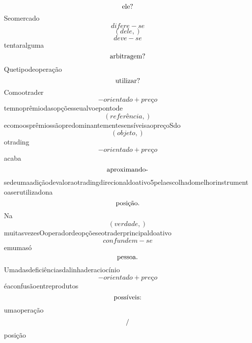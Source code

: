 \documentclass{article}
\begin{document}
\begin{equation}
$ele?$
\end{equation}Seomercado\begin{equation}
difere - se
\end{equation}\begin{equation}
\left( dele,\right)
\end{equation}\begin{equation}
deve - se
\end{equation}tentaralguma\begin{equation}
$arbitragem?$
\end{equation}Quetipodeoperação\begin{equation}
$utilizar?$
\end{equation}Comootrader\begin{equation}
- orientado + preço
\end{equation}temnoprêmiodasopçõesseualvoepontode\begin{equation}
\left( referência,\right)
\end{equation}ecomoosprêmiossãopredominantementesensíveisaopreçoSdo\begin{equation}
\left( objeto,\right)
\end{equation}otrading\begin{equation}
- orientado + preço
\end{equation}acaba\begin{equation}
$aproximando-$
\end{equation}sedeumaadiçãodevaloraotradingdirecionaldoativo5pelaescolhadomelhorinstrumentoaserutilizadona\begin{equation}
$posição.$
\end{equation}Na\begin{equation}
\left( verdade,\right)
\end{equation}muitasvezesOoperadordeopçõeseotraderprincipaldoativo\begin{equation}
confundem - se
\end{equation}emumasó\begin{equation}
$pessoa.$
\end{equation}Umadasdeficiênciasdalinhaderaciocínio\begin{equation}
- orientado + preço
\end{equation}éaconfusãoentreprodutos\begin{equation}
$possíveis:$
\end{equation}umaoperação\begin{equation}
$/$
\end{equation}posição\begin{equation}

\end{equation}
\end{document}
